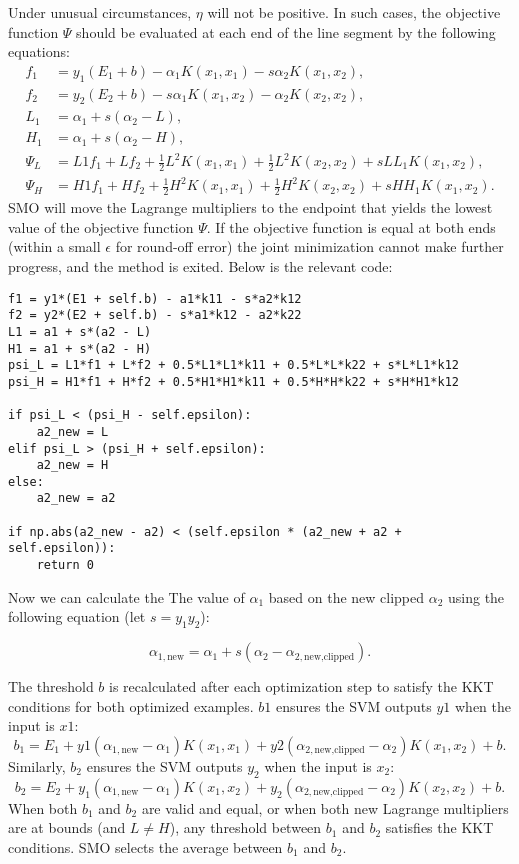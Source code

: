 \documentclass[10pt,a4paper]{article}
\begin{document}
Under unusual circumstances, \( \eta \) will not be positive. In such cases, the objective function \( \Psi \) should be evaluated at each end of the line segment by the following equations:
\[
\begin{aligned}
	f_1 &= y_1 (E_1 + b) - \alpha_1 K(x_1, x_1) - s \alpha_2 K(x_1, x_2), \\
	f_2 &= y_2 (E_2 + b) - s \alpha_1 K(x_1, x_2) - \alpha_2 K(x_2, x_2), \\
	L_1 &= \alpha_1 + s(\alpha_2 - L), \\
	H_1 &= \alpha_1 + s(\alpha_2 - H),\\
	\Psi_L &= L1 f_1 + L f_2 + \frac{1}{2} L^2 K(x_1, x_1) + \frac{1}{2} L^2 K(x_2, x_2) + s L L_1 K(x_1, x_2), \\
	\Psi_H &= H1 f_1 + H f_2 + \frac{1}{2} H^2 K(x_1, x_1) + \frac{1}{2} H^2 K(x_2, x_2) + s H H_1 K(x_1, x_2).
\end{aligned}
\]
SMO will move the Lagrange multipliers to the endpoint that yields the lowest value of the objective function \( \Psi \). If the objective function is equal at both ends (within a small \( \epsilon \) for round-off error) the joint minimization cannot make further progress, and the method is exited. Below is the relevant code:

\begin{lstlisting}
f1 = y1*(E1 + self.b) - a1*k11 - s*a2*k12
f2 = y2*(E2 + self.b) - s*a1*k12 - a2*k22
L1 = a1 + s*(a2 - L)
H1 = a1 + s*(a2 - H)
psi_L = L1*f1 + L*f2 + 0.5*L1*L1*k11 + 0.5*L*L*k22 + s*L*L1*k12
psi_H = H1*f1 + H*f2 + 0.5*H1*H1*k11 + 0.5*H*H*k22 + s*H*H1*k12
	
if psi_L < (psi_H - self.epsilon):
	a2_new = L
elif psi_L > (psi_H + self.epsilon):
	a2_new = H
else:
	a2_new = a2

if np.abs(a2_new - a2) < (self.epsilon * (a2_new + a2 + self.epsilon)):
	return 0
\end{lstlisting}

Now we can calculate the The value of \( \alpha_1 \) based on the new clipped \( \alpha_2 \) using the following equation (let \( s = y_1 y_2 \)):

\[
\alpha_{1,\text{new}} = \alpha_1 + s (\alpha_2 - \alpha_{2,\text{new,clipped}}).
\]

The threshold \( b \) is recalculated after each optimization step to satisfy the KKT conditions for both optimized examples. \( b1 \) ensures the SVM outputs \( y1 \) when the input is \( x1 \):
\[
b_1 = E_1 + y1 (\alpha_{1,\text{new}} - \alpha_1) K(x_1, x_1) + y2 (\alpha_{2,\text{new,clipped}} - \alpha_2) K(x_1, x_2) + b.
\]
Similarly, \( b_2 \) ensures the SVM outputs \( y_2 \) when the input is \( x_2 \):
\[
b_2 = E_2 + y_1 (\alpha_{1,\text{new}} - \alpha_1) K(x_1, x_2) + y_2 (\alpha_{2,\text{new,clipped}} - \alpha_2) K(x_2, x_2) + b.
\]
When both \( b_1 \) and \( b_2 \) are valid and equal, or when both new Lagrange multipliers are at bounds (and \( L \neq H \)), any threshold between \( b_1 \) and \( b_2 \) satisfies the KKT conditions. SMO selects the average between \( b_1 \) and \( b_2 \).
\end{document}
